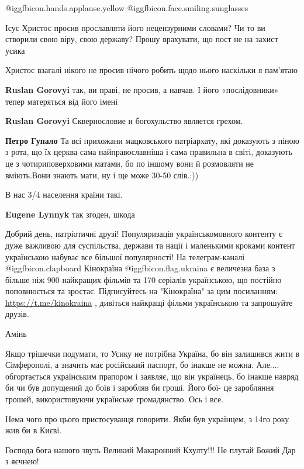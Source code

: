 \begin{itemize}
 @igg{fbicon.hands.applause.yellow}  @igg{fbicon.face.smiling.sunglasses} 


Ісус Христос просив прославляти його нецензурними словами? Чи то ви створили
свою віру, свою державу? Прошу врахувати, що пост не на захист усика

\begin{itemize} %
Христос взагалі нікого не просив нічого робить щодо нього наскільки я пам'ятаю

\textbf{Ruslan Gorovyi} так, ви праві, не просив, а навчав. І його «послідовники» тепер матеряться від його імені

\textbf{Ruslan Gorovyi} Сквернословие и богохульство является грехом.

\textbf{Петро Гупало} Та всі прихожани мацковського патріархату, які доказують з піною з рота, що їх церква сама найправославніша і сама правильна в світі, доказують це з чотириповерховими матами, бо по іншому вони й розмовляти не вміють.Вони знають мати, ну і ще може 30-50 слів.:))
\end{itemize} %

В нас 3/4 населення країни такі.

\begin{itemize} %
\textbf{Eugene Lynnyk} так згоден, шкода
\end{itemize} %


Добрий день, патріотичні друзі! Популяризація українськомовного контенту є дуже
важливою для суспільства, держави та нації і маленькими кроками контент
українською набуває все більшої популярності! На телеграм-каналі  @igg{fbicon.clapboard}  Кінокраїна
@igg{fbicon.flag.ukraina} є величезна база з більше ніж 900 найкращих фільмів та 170 серіалів
українською, що постійно поповнюється та зростає. Підписуйтесь на "Кінокраїна"
за цим посиланням: \url{https://t.me/kinokraina} , дивіться найкращі фільми
українською та запрошуйте друзів.

Амінь


Якщо трішечки подумати, то Усику не потрібна Україна, бо він залишився жити в
Сімферополі, а значить має російський паспорт, бо інакше не
можна. Але.... обгортається українським прапором і заявляє, що він українець, бо
інакше навряд би чи був допущений до боїв і заробляв би гроші. Його бої- це
заробляння грошей, використовуючи українське громадянство. Ось і все.

Нема чого про цього пристосуванця говорити. Якби був українцем, з 14го року жив би в Києві.

Господа бога нашого звуть Великий Макаронний Кхулту!!! Не плутай Божий Дар з яєчнею!

 


\end{itemize} %
